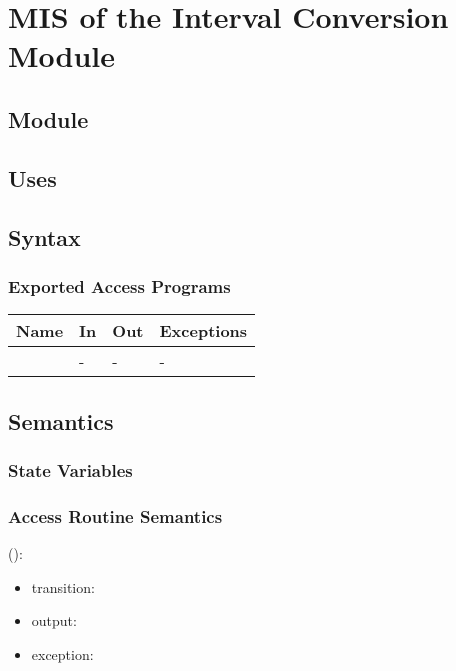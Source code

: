 \documentclass[12pt, titlepage]{article}
\begin{document}
\newpage

\section{MIS of the Interval Conversion Module} 
\label{Module_intervalconversion}

\subsection{Module}


\subsection{Uses}


\subsection{Syntax}

\subsubsection{Exported Access Programs}

\begin{center}
	\begin{tabular}{p{3cm} p{4cm} p{4cm} p{2cm}}
		\hline
		\textbf{Name} & \textbf{In} & \textbf{Out} & \textbf{Exceptions} \\
		\hline
		\wss{accessProg} & - & - & - \\
		\hline
	\end{tabular}
\end{center}

\subsection{Semantics}

\subsubsection{State Variables}


\subsubsection{Access Routine Semantics}

\noindent {}():
\begin{itemize}
	\item transition:  
	\item output:  
	\item exception:  
\end{itemize}
\end{document}
